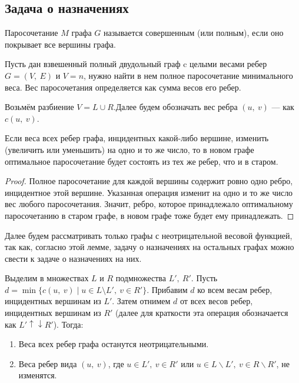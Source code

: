 \documentclass[a4paper,12pt]{article}
\begin{document}
\subsection{Задача о назначениях}
\begin{on1n}
Паросочетание $M$ графа $G$ называется совершенным (или полным), если оно покрывает все вершины графа.

Пусть дан взвешенный полный двудольный граф c целыми весами ребер $G = (V,\ E)$ и $V = n$, нужно найти в нем полное паросочетание минимального веса. Вес паросочетания определяется как сумма весов его ребер. 
\end{on1n}
Возьмём разбиение $V = L\cup R$.Далее будем обозначать вес ребра $(u,\ v)$ — как $c(u,\ v)$.
\begin{fulllemma}
Если веса всех ребер графа, инцидентных какой-либо вершине, изменить (увеличить или уменьшить) на одно и то же число, то в новом графе оптимальное паросочетание будет состоять из тех же ребер, что и в старом.
\end{fulllemma}
\begin{proof}
Полное паросочетание для каждой вершины содержит ровно одно ребро, инцидентное этой вершине. Указанная операция изменит на одно и то же число вес любого паросочетания. Значит, ребро, которое принадлежало оптимальному паросочетанию в старом графе, в новом графе тоже будет ему принадлежать.
\end{proof}
Далее будем рассматривать только графы с неотрицательной весовой функцией, так как, согласно этой лемме, задачу о назначениях на остальных графах можно свести к задаче о назначениях на них.
\begin{fulllemma}
Выделим в множествах $L$ и $R$ подмножества $L',\ R'$. Пусть $d = \min \{c(u,\ v) \mid u \in L \setminus L',\ v \in R'\}$. Прибавим $d$ ко всем весам ребер, инцидентных вершинам из $L'$. Затем отнимем $d$ от всех весов ребер, инцидентных вершинам из $R'$ (далее для краткости эта операция обозначается как $L' \uparrow\downarrow R'$). Тогда:
\begin{enumerate}
    \item Веса всех ребер графа останутся неотрицательными.
    \item Веса ребер вида $(u,\ v)$, где $u \in L',\ v \in R'$ или $u \in L \backslash L',\ v \in R \backslash R'$, не изменятся.
\end{enumerate}
\end{fulllemma}
\end{document}
